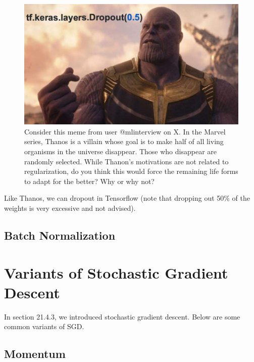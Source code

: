\documentclass{article}
\begin{document}
\begin{figure}[h]
    \centering
    \includegraphics[scale = 0.24]{dl-figures/thanos-dropout-meme.jpg}
    \caption{Consider this meme from user @mlinterview on X. In the Marvel series, Thanos is a villain whose goal is to make half of all living organisms in the universe disappear. Those who disappear are randomly selected. While Thanon's motivations are not related to regularization, do you think this would force the remaining life forms to adapt for the better? Why or why not?}
    \label{figure:thanos-dropout-meme}
\end{figure}

\FloatBarrier

Like Thanos, we can dropout in Tensorflow (note that dropping out 50\% of the weights is very excessive and not advised)\cite{tensorflow2015-whitepaper}.



\FloatBarrier

\subsection{Batch Normalization}

\section{Variants of Stochastic Gradient Descent} %

In section 21.4.3, we introduced stochastic gradient descent. Below are some common variants of SGD.

\subsection{Momentum} %
\end{document}
